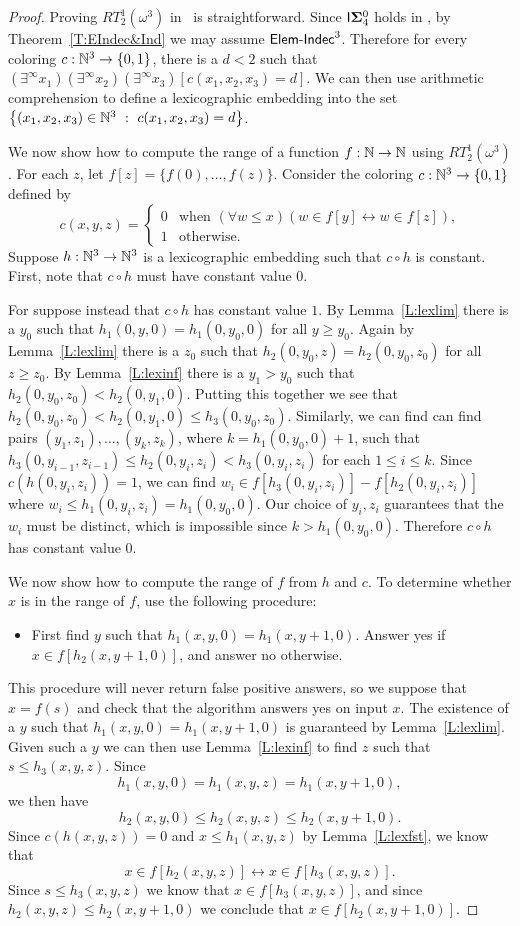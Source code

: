 \begin{proof}
Proving $RT^1_2(\omega^3)$ in \ACAo\ is straightforward.
Since $\mathsf{I}{\mathbf{\Sigma}^0_4}$ holds in \ACAo, by Theorem~\ref{T:EIndec&Ind}
we may assume $\mathsf{Elem{\mbox{-}}Indec}^3$.
Therefore for every coloring $c:\mathbb{N}^3\to\{0,1\}$, there is a $d<2$ such that
$(\exists^\infty x_1)(\exists^\infty x_2)(\exists^\infty x_3)[c(x_1,x_2,x_3)=d].$
We can then use arithmetic comprehension to define a lexicographic embedding
into the set $\left\{(x_1,x_2,x_3)\in\mathbb{N}^3\ :\ c(x_1,x_2,x_3)=d\right\}$.

We now show how to compute the range of a function $f:\mathbb{N}\to\mathbb{N}$ using $RT^1_2(\omega^3)$.
For each $z$, let $f[z] = \{f(0),\dots,f(z)\}$.
Consider the coloring $c:\mathbb{N}^3\to\{0,1\}$ defined by
$$c(x,y,z) =
\begin{cases}
0 & \text{when $(\forall w \leq x)(w \in f[y] \leftrightarrow w \in f[z])$,} \\
1 & \text{otherwise.}
\end{cases}$$
Suppose $h:\mathbb{N}^3\to\mathbb{N}^3$ is a lexicographic embedding
such that $c\circ h$ is constant.
First, note that $c \circ h$ must have constant value $0$.

For suppose instead that $c \circ h$ has constant value $1$.
By Lemma~\ref{L:lexlim} there is a $y_0$ such that
$h_1(0,y,0) = h_1(0,y_0,0)$ for all $y \geq y_0$.
Again by Lemma~\ref{L:lexlim} there is a $z_0$ such that
$h_2(0,y_0,z) = h_2(0,y_0,z_0)$ for all $z \geq z_0$.
By Lemma~\ref{L:lexinf} there is a $y_1>y_0$ such that
$h_2(0,y_0,z_0)<h_2(0,y_1,0)$.
Putting this together we see that
$h_2(0,y_0,z_0) < h_2(0,y_1,0) \leq h_3(0,y_0,z_0)$.
Similarly, we can find can find pairs $(y_1,z_1),\dots,(y_k,z_k)$,
where $k=h_1(0,y_0,0)+1$,
such that $h_3(0,y_{i-1},z_{i-1}) \leq h_2(0,y_i,z_i) < h_3(0,y_i,z_i)$
for each $1 \leq i \leq k$.
Since $c(h(0,y_i,z_i)) = 1$, we can find
$w_i \in f[h_3(0,y_i,z_i)] - f[h_2(0,y_i,z_i)]$ where
$w_i \leq h_1(0,y_i,z_i) = h_1(0,y_0,0)$.
Our choice of $y_i,z_i$ guarantees that the $w_i$ must be distinct,
which is impossible since $k > h_1(0,y_0,0)$.
Therefore $c \circ h$ has constant value $0$.

We now show how to compute the range of $f$ from $h$ and $c$.
To determine whether $x$ is in the range of $f$, use the following procedure:
\begin{itemize}
\item[] First find $y$ such that $h_1(x,y,0) = h_1(x,y+1,0)$.
		Answer yes if $x \in f[h_2(x,y+1,0)]$, and answer no otherwise.
\end{itemize}
This procedure will never return false positive answers,
so we suppose that $x = f(s)$ and check that the algorithm answers yes on input $x$.
The existence of a $y$ such that $h_1(x,y,0) = h_1(x,y+1,0)$
is guaranteed by Lemma~\ref{L:lexlim}.
Given such a $y$ we can then use Lemma~\ref{L:lexinf} to find $z$
such that $s \leq h_3(x,y,z)$.
Since
$$h_1(x,y,0) = h_1(x,y,z) = h_1(x,y+1,0),$$
we then have
$$h_2(x,y,0) \leq h_2(x,y,z) \leq h_2(x,y+1,0).$$
Since $c(h(x,y,z)) = 0$ and $x \leq h_1(x,y,z)$ by Lemma~\ref{L:lexfst},
we know that
$$x \in f[h_2(x,y,z)] \leftrightarrow x \in f[h_3(x,y,z)].$$
Since $s \leq h_3(x,y,z)$ we know that $x \in f[h_3(x,y,z)]$,
and since $h_2(x,y,z) \leq h_2(x,y+1,0)$ we conclude that $x \in f[h_2(x,y+1,0)]$.
\end{proof}

